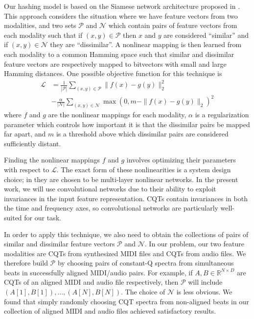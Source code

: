 \documentclass{article}
\begin{document}
Our hashing model is based on the Siamese network architecture proposed in \cite{masci2014multimodal}.
This approach considers the situation where we have feature vectors from two modalities, and two sets $\mathcal{P}$ and $\mathcal{N}$ which contain pairs of feature vectors from each modality such that if $(x, y) \in \mathcal{P}$ then $x$ and $y$ are considered ``similar'' and if $(x, y) \in \mathcal{N}$ they are ``dissimilar''.
A nonlinear mapping is then learned from each modality to a common Hamming space such that similar and dissimilar feature vectors are respectively mapped to bitvectors with small and large Hamming distances.
One possible objective function for this technique is
\begin{align*}
\mathcal{L} &= \frac{1}{|\mathcal{P}|} \sum_{(x, y) \in \mathcal{P}} \| f(x) - g(y) \|_2^2\\
& - \frac{\alpha}{|\mathcal{N}|} \sum_{(x, y) \in \mathcal{N}} \max(0, m - \|f(x) - g(y) \|_2)^2
\end{align*}
where $f$ and $g$ are the nonlinear mappings for each modality, $\alpha$ is a regularization parameter which controls how important it is that the dissimilar pairs be mapped far apart, and $m$ is a threshold above which dissimilar pairs are considered sufficiently distant.

Finding the nonlinear mappings $f$ and $g$ involves optimizing their parameters with respect to $\mathcal{L}$.
The exact form of these nonlinearities is a system design choice; in \cite{masci2014multimodal} they are chosen to be multi-layer nonlinear networks.
In the present work, we will use convolutional networks due to their ability to exploit invariances in the input feature representation.
CQTs contain invariances in both the time and frequency axes, so convolutional networks are particularly well-suited for our task.

In order to apply this technique, we also need to obtain the collections of pairs of similar and dissimilar feature vectors $\mathcal{P}$ and $\mathcal{N}$.
In our problem, our two feature modalities are CQTs from synthesized MIDI files and CQTs from audio files.
We therefore build $\mathcal{P}$ by choosing pairs of constant-Q spectra from simultaneous beats in successfully aligned MIDI/audio pairs.
For example, if $A, B \in \mathbb{R}^{N \times D}$ are CQTs of an aligned MIDI and audio file respectively, then $\mathcal{P}$ will include $(A[1], B[1]), \ldots, (A[N], B[N])$.
The choice of $\mathcal{N}$ is less obvious.
We found that simply randomly choosing CQT spectra from non-aligned beats in our collection of aligned MIDI and audio files achieved satisfactory results.
\end{document}
